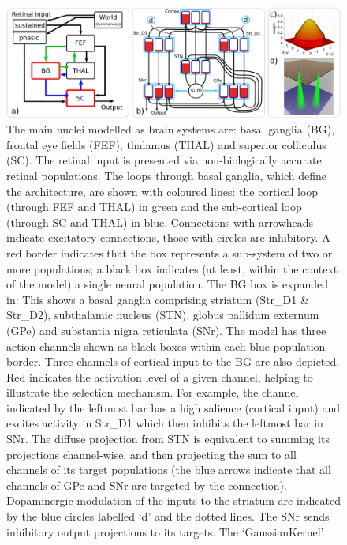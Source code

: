 \documentclass{frontiersSCNS}
\begin{document}
\begin{figure}[!ht]
\begin{center}
\includegraphics[width=\textwidth]{./figures/ccg_model.png}
\end{center}
\caption{  The main
nuclei modelled as brain systems are: basal ganglia (BG), frontal eye
fields (FEF), thalamus (THAL) and superior colliculus (SC). The
retinal input is presented via non-biologically accurate retinal
populations. The loops through basal ganglia, which define the
architecture, are shown with coloured lines: the cortical loop
(through FEF and THAL) in green and the sub-cortical loop (through SC
and THAL) in blue. Connections with arrowheads indicate excitatory
connections, those with circles are inhibitory. A red border indicates
that the box represents a sub-system of two or more populations; a
black box indicates (at least, within the context of the model) a
single neural population. The BG box is expanded in: 
%
This shows a basal ganglia comprising striatum (Str\_D1 \& Str\_D2),
subthalamic nucleus (STN), globus pallidum externum (GPe) and
substantia nigra reticulata (SNr). The model has three action channels
shown as black boxes within each blue population border. Three
channels of cortical input to the BG are also depicted. Red indicates
the activation level of a given channel, helping to illustrate the
selection mechanism. For example, the channel indicated by the
leftmost bar has a high salience (cortical input) and excites activity
in Str\_D1 which then inhibits the leftmost bar in SNr. The diffuse
projection from STN is equivalent to summing its projections
channel-wise, and then projecting the sum to all channels of its
target populations (the blue arrows indicate that all channels of GPe
and SNr are targeted by the connection). Dopaminergic modulation of
the inputs to the striatum are indicated by the blue circles labelled
`d' and the dotted lines. The SNr sends inhibitory output projections
to its targets.  The `GaussianKernel'
}
\end{figure}
\end{document}
